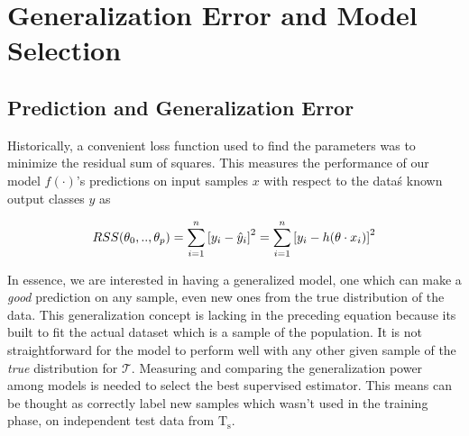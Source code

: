 
\chapter{Generalization Error and Model Selection }\label{ch:modelSelection}



\section{Prediction and Generalization Error}\label{subsection-generalizationError}

Historically, a convenient loss function used to find the parameters was to minimize the residual sum of squares.
This measures the performance of our model $f(\cdot)$'s predictions on input samples $x$ with respect to the data\'s known output classes $y$ as

\begin{equation}
RSS(\theta_0,..,\theta_p) = \sum_{i=1}^n {[y_i - \hat{y}_i ] }^2 \\
= \sum_{i=1}^n  {[y_i - h( \theta \cdot x_i)] }^2
\label{eq:rss}
\end{equation}



In essence, we are interested in having a generalized model, one which can make a \textit{good} prediction on any sample, even new ones from the true distribution of the data.
This generalization concept is lacking in the preceding equation because its built to fit the actual dataset which is a sample of the population.
It is not straightforward for the model to perform well with any other given sample of the \textit{true} distribution for $\mathcal{T}$.
Measuring and comparing the generalization power among models is needed to select the best supervised estimator. 
This means can be thought as correctly label new samples which wasn't used in the training phase, on independent test data from $\mathrm{T_s}$.


